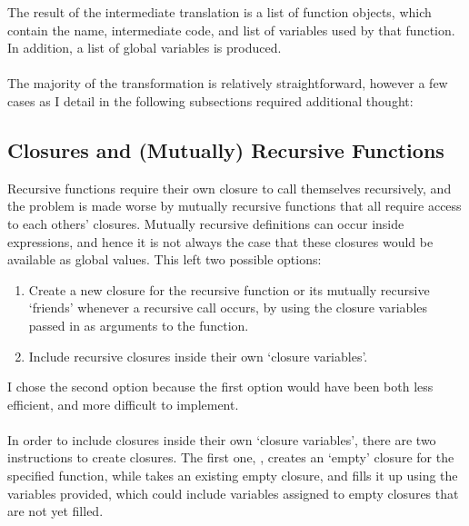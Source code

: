 The result of the intermediate translation is a list of function objects, which contain the name, intermediate code, and list of variables used by that function. In addition, a list of global variables is produced.
\\\\
The majority of the transformation is relatively straightforward, however a few cases as I detail in the following subsections required additional thought:

\subsection{Closures and (Mutually) Recursive Functions}
Recursive functions require their own closure to call themselves recursively, and the problem is made worse by mutually recursive functions that all require access to each others' closures. Mutually recursive definitions can occur inside expressions, and hence it is not always the case that these closures would be available as global values. This left two possible options:
\begin{enumerate}
\item Create a new closure for the recursive function or its mutually recursive `friends' whenever a recursive call occurs, by using the closure variables passed in as arguments to the function.
\item Include recursive closures inside their own `closure variables'.
\end{enumerate}
I chose the second option because the first option would have been both less efficient, and more difficult to implement.
\\\\
In order to include closures inside their own `closure variables', there are two instructions to create closures. The first one, , creates an `empty' closure for the specified function, while  takes an existing empty closure, and fills it up using the variables provided, which could include variables assigned to empty closures that are not yet filled.

